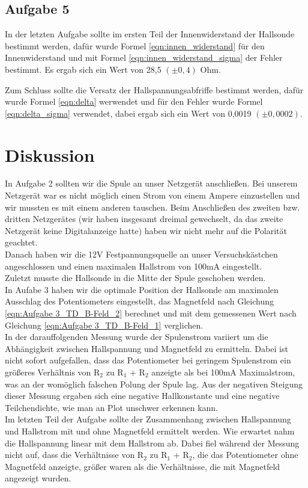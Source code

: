 \documentclass[12pt]{scrartcl}
\begin{document}
\subsection{Aufgabe 5}
In der letzten Aufgabe sollte im ersten Teil der Innenwiderstand der Hallsonde bestimmt werden, dafür wurde Formel \ref{eqn:innen_widerstand} für den Innenwiderstand und mit Formel \ref{eqn:innen_widerstand_sigma} der Fehler bestimmt. Es ergab sich ein Wert von 28,5 $(\pm 0,4)$ Ohm.

Zum Schluss sollte die Versatz der Hallspannungsabfriffe bestimmt werden, dafür wurde Formel \ref{eqn:delta} werwendet und für den Fehler wurde Formel \ref{eqn:delta_sigma} verwendet, dabei ergab sich ein Wert von 0,0019 $(\pm 0,0002)$.


\section{Diskussion}

In Aufgabe 2 sollten wir die Spule an unser Netzgerät anschließen. Bei unserem Netzgerät war es nicht möglich einen Strom von einem Ampere einzustellen und wir mussten es mit einem anderen tauschen. Beim Anschließen des zweiten bzw. dritten Netzgerätes (wir haben insgesamt dreimal gewechselt, da das zweite Netzgerät keine Digitalanzeige hatte) haben wir nicht mehr auf die Polarität geachtet.\\
Danach haben wir die 12V Festpannungsquelle an unser Versuchskästchen angeschlossen und einen maximalen Hallstrom von 100mA eingestellt.\\
Zuletzt musste die Hallsonde in die Mitte der Spule geschoben werden.\\
In Aufabe 3 haben wir die optimale Position der Hallsonde am maximalen Ausschlag des Potentiometers eingestellt, das Magnetfeld nach Gleichung \ref{eqn:Aufgabe 3_TD_B-Feld_2} berechnet und mit dem gemessenen Wert nach Gleichung \ref{eqn:Aufgabe 3_TD_B-Feld_1} verglichen.\\
In der darauffolgenden Messung wurde der Spulenstrom variiert um die Abhängigkeit zwischen Hallspannung und Magnetfeld zu ermitteln. Dabei ist nicht sofort aufgefallen, dass das Potentiometer bei geringem Spulenstrom ein größeres Verhältnis von R$_2$ zu R$_1$ + R$_2$ anzeigte als bei 100mA Maximalstrom, was an der womöglich falschen Polung der Spule lag. Aus der negativen Steigung dieser Messung ergaben sich eine negative Hallkonstante und eine negative Teilchendichte, wie man an Plot %
unschwer erkennen kann.\\
Im letzten Teil der Aufgabe sollte der Zusammenhang zwischen Hallspannung und Hallstrom mit und ohne Magnetfeld ermittelt werden. Wie erwartet nahm die Hallspannung linear mit dem Hallstrom ab. Dabei fiel während der Messung nicht auf, dass die Verhältnisse von R$_2$ zu R$_1$ + R$_2$, die das Potentiometer ohne Magnetfeld anzeigte, größer waren als die Verhältnisse, die mit Magnetfeld angezeigt wurden.
\end{document}
